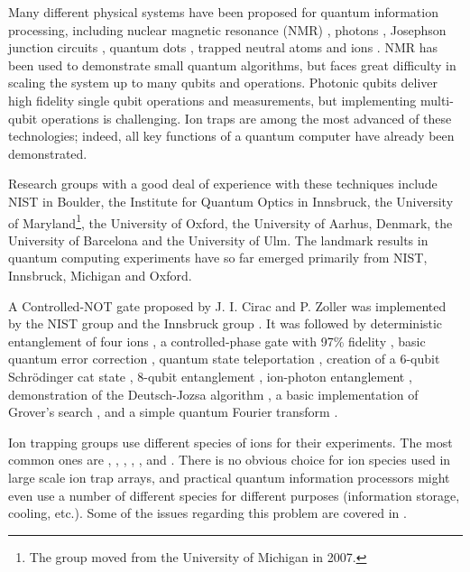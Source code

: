Many different physical systems have been proposed for quantum information processing, including nuclear magnetic resonance (NMR) \cite{Nielson2000}, photons \cite{Knill2001}, Josephson junction circuits \cite{You2005}, quantum dots \cite{Engel2004}, trapped neutral atoms \cite{Briegel2000,Deutsch2000} and ions  \cite{Cirac1995, Cirac2000}.
NMR has been used to demonstrate small quantum algorithms, but faces great difficulty in scaling the system up to many qubits and operations. Photonic qubits deliver high fidelity single qubit operations and measurements, but implementing multi-qubit operations is challenging.
Ion traps are among the most advanced of these technologies; indeed, all key functions of a quantum computer have already been demonstrated. 

Research groups with a good deal of experience with these techniques include NIST in Boulder, the Institute for Quantum Optics in Innsbruck, the University of Maryland\footnote{The group moved from the University of Michigan in 2007.}, the University of Oxford, the University of Aarhus, Denmark, the University of Barcelona and the University of Ulm. The landmark results in quantum computing experiments have so far emerged primarily from NIST, Innsbruck, Michigan and Oxford.

A Controlled-NOT gate proposed by J. I. Cirac and P. Zoller \cite{Cirac1995} was implemented by the NIST group \cite{Monroe1995} and the Innsbruck group \cite{Schmidt-Kaler2003}. It was followed by deterministic entanglement of four ions \cite{Sackett2000}, a controlled-phase gate with 97\% fidelity \cite{Leibfried2003a}, basic quantum error correction \cite{Chiaverini2004}, quantum state teleportation \cite{Riebe2004}, creation of a 6-qubit Schr\"odinger cat state \cite{Leibfried2005}, 8-qubit entanglement \cite{Haeffner2005}, ion-photon entanglement \cite{Blinov2004}, demonstration of the Deutsch-Jozsa algorithm \cite{Gulde2003}, a basic implementation of Grover's search \cite{Brickman2005}, and a simple quantum Fourier transform \cite{Chiaverini2005}. 

Ion trapping groups use different species of ions for their experiments. The most common ones are , , , , ,  and . There is no obvious choice for ion species used in large scale ion trap arrays, and practical quantum information processors might even use a number of different species for different purposes (information storage, cooling, etc.). Some of the issues regarding this problem are covered in \cite{Steane1997,Ozeri2007}.


